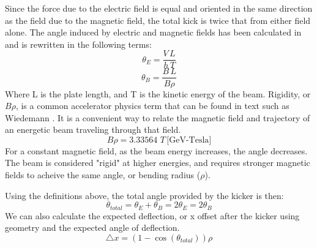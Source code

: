 Since the force due to the electric field is equal and oriented in the same direction as the field due to the magnetic field, 
the total kick is twice that from either field alone.  
The angle induced by electric and magnetic fields has been calculated in \cite{iukicker, Wiedemann}
and is rewritten in the following terms:  
\begin{equation}
\theta_E= \frac{V\,L}{h\,T}
\end{equation}
\begin{equation}
\theta_B= \frac{B\,L}{B\rho}
\end{equation}
Where L is the plate length, and T is the kinetic energy of the beam. 
Rigidity, or $B\rho$, is a common accelerator physics term that can be found in text such as Wiedemann \cite{Wiedemann}. 
It is a convenient way to relate the magnetic field and trajectory of an energetic beam traveling through that field.
\begin{equation}
	B\rho=3.33564\,\,T\, \text{[GeV-Tesla]}
\end{equation} 
For a constant magnetic field, as the beam energy increases, the angle decreases. 
The beam is considered "rigid" at higher energies, 
and requires stronger magnetic fields to acheive the same angle, or bending radius ($\rho$).

Using the definitions above, the total angle provided by the kicker is then: 
\begin{equation}
\theta_{total}= \theta_E+\theta_B=2\theta_E=2\theta_B
\end{equation}
We can also calculate the expected deflection, or x offset after the kicker 
using geometry and the expected angle of deflection. 
\begin{equation}
	\triangle x = \left(1-\cos\left(\theta_{total}\right)\right)\rho
\end{equation}

